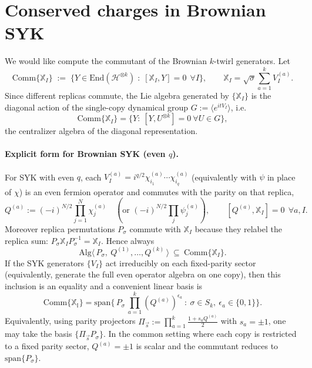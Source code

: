 \documentclass{article}
\theoremstyle{definition}
\begin{document}
\section{Conserved charges in Brownian SYK}

    We would like compute the commutant of the Brownian $k$-twirl generators. Let
    \[
        \mathrm{Comm}\{\mathbb{X}_{I}\}\;:=\;\Big\{Y\in\mathrm{End}(\mathcal{H}^{\otimes
        k})\;:\;[\mathbb{X}_{I},Y]=0\ \ \forall I\Big\}, \qquad \mathbb{X}_{I}=\sqrt{\sigma}
        \sum_{a=1}^{k}V_{I}^{(a)}.
    \]
    Since different replicas commute, the Lie algebra generated by
    $\{\mathbb{X}_{I}\}$ is the diagonal action of the single-copy dynamical
    group $G:=\langle e^{itV_I}\rangle$, i.e.
    \[
        \mathrm{Comm}\{\mathbb{X}_{I}\}=\{Y:\ [Y,U^{\otimes k}]=0\ \forall U\in G
        \},
    \]
    the centralizer algebra of the diagonal representation.

    \paragraph{Explicit form for Brownian SYK (even $q$).}
    For SYK with even $q$, each
    $V_{I}^{(a)}=i^{q/2}\chi^{(a)}_{i_1}\cdots\chi^{(a)}_{i_q}$ (equivalently with
    $\psi$ in place of $\chi$) is an even fermion operator and commutes with the
    parity on that replica,
    \[
        Q^{(a)}:=(-i)^{N/2}\prod_{j=1}^{N}\chi^{(a)}_{j}\quad (\text{or }(-i)^{N/2}
        \prod_{j}\psi^{(a)}_{j}),\qquad [Q^{(a)},\mathbb{X}_{I}]=0\ \ \forall a,
        I.
    \]
    Moreover replica permutations $P_{\sigma}$ commute with $\mathbb{X}_{I}$ because
    they relabel the replica sum:
    $P_{\sigma}\mathbb{X}_{I}P_{\sigma}^{-1}=\mathbb{X}_{I}$. Hence always
    \[
        \mathrm{Alg}\langle\,P_{\sigma},\ Q^{(1)},\dots,Q^{(k)}\,\rangle\ \subseteq
        \ \mathrm{Comm}\{\mathbb{X}_{I}\}.
    \]
    If the SYK generators $\{V_{I}\}$ act irreducibly on each fixed-parity sector
    (equivalently, generate the full even operator algebra on one copy), then this
    inclusion is an equality and a convenient linear basis is
    \[
        \boxed{\quad \mathrm{Comm}\{\mathbb{X_I}\} =\mathrm{span}\Big\{\,P_\sigma\,\prod_{a=1}^k (Q^{(a)})^{\epsilon_a}\ :\ \sigma\in S_k,\ \epsilon_a\in\{0,1\}\Big\}. \quad}
    \]
    Equivalently, using parity projectors
    $\Pi_{\vec s}:=\prod_{a=1}^{k}\frac{1+s_{a}Q^{(a)}}{2}$ with $s_{a}=\pm1$, one
    may take the basis $\{\Pi_{\vec s}P_{\sigma}\}$. In the common setting where
    each copy is restricted to a fixed parity sector, $Q^{(a)}=\pm1$ is scalar and
    the commutant reduces to $\mathrm{span}\{P_{\sigma}\}$.

    
    
\end{document}

